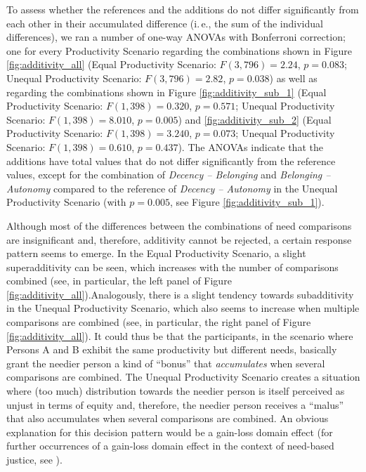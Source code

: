 \documentclass[egregdoesnotlikesansseriftitles]{scrartcl}
\begin{document}
To assess whether the references and the additions do not differ significantly from each other in their accumulated difference (i.\,e., the sum of the individual differences), we ran a number of one-way ANOVAs with Bonferroni correction; one for every Productivity Scenario regarding the combinations shown in Figure \ref{fig:additivity_all} (Equal Productivity Scenario: $F(3, 796) = 2.24$, $p = 0.083$; Unequal Productivity Scenario: $F(3, 796) = 2.82$, $p = 0.038$) as well as regarding the combinations shown in Figure \ref{fig:additivity_sub_1} (Equal Productivity Scenario: $F(1, 398) = 0.320$, $p = 0.571$; Unequal Productivity Scenario: $F(1, 398) = 8.010$, $p = 0.005$) and \ref{fig:additivity_sub_2} (Equal Productivity Scenario: $F(1, 398) = 3.240 $, $p = 0.073$; Unequal Productivity Scenario: $F(1, 398) = 0.610$, $p = 0.437$).
The ANOVAs indicate that the additions have total values that do not differ significantly from the reference values, except for the combination of \textit{Decency -- Belonging} and \textit{Belonging -- Autonomy} compared to the reference of \textit{Decency -- Autonomy} in the Unequal Productivity Scenario (with $p = 0.005$, see Figure \ref{fig:additivity_sub_1}).

Although most of the differences between the combinations of need comparisons are insignificant and, therefore, additivity cannot be rejected, a certain response pattern seems to emerge.
In the Equal Productivity Scenario, a slight superadditivity can be seen, which increases with the number of comparisons combined (see, in particular, the left panel of Figure \ref{fig:additivity_all}).Analogously, there is a slight tendency towards subadditivity in the Unequal Productivity Scenario, which also seems to increase when multiple comparisons are combined (see, in particular, the right panel of Figure \ref{fig:additivity_all}).
It could thus be that the participants, in the scenario where Persons A and B exhibit the same productivity but different needs, basically grant the needier person a kind of ``bonus'' that \textit{accumulates} when several comparisons are combined.
The Unequal Productivity Scenario creates a situation where (too much) distribution towards the needier person is itself perceived as unjust in terms of equity and, therefore, the needier person receives a ``malus'' that also accumulates when several comparisons are combined.
An obvious explanation for this decision pattern would be a gain-loss domain effect (for further occurrences of a gain-loss domain effect in the context of need-based justice, see \citealt{weis_needs_2017}).
\end{document}
